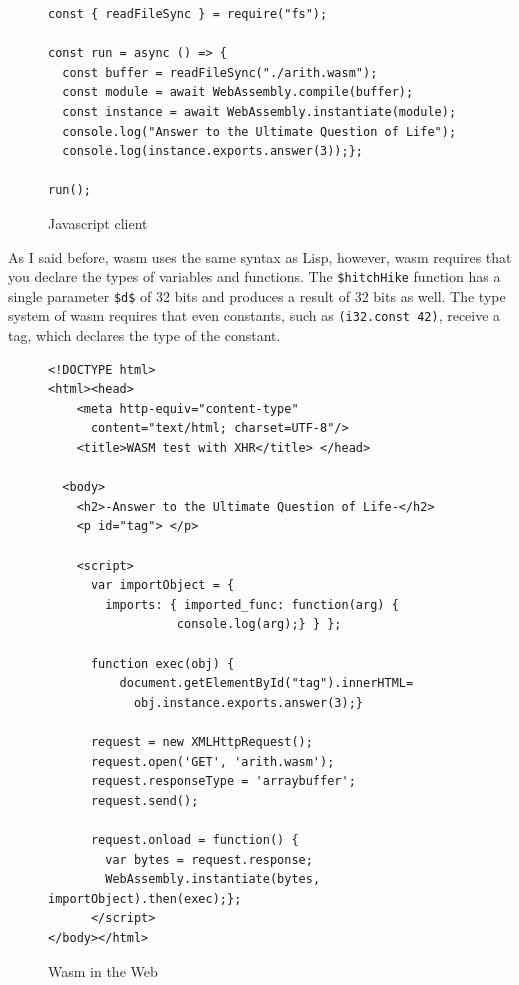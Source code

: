 \documentclass[a4paper,12pt]{book}
\begin{document}
\begin{figure}[!h]
\begin{verbatim}
const { readFileSync } = require("fs");

const run = async () => {
  const buffer = readFileSync("./arith.wasm");
  const module = await WebAssembly.compile(buffer);
  const instance = await WebAssembly.instantiate(module);
  console.log("Answer to the Ultimate Question of Life");
  console.log(instance.exports.answer(3));};

run();
\end{verbatim}

\caption{Javascript client}
\label{wasm:client}
\end{figure}

As I said before, wasm uses the same syntax
as Lisp, however, wasm requires that you declare
the types of variables and functions. The
\verb|$hitchHike| function has a single
parameter \verb|$d$| of 32 bits and produces
a result of 32 bits as well. The type system
of wasm requires that even constants, such
as \verb|(i32.const 42)|, receive a tag, which
declares the type of the constant.


\begin{figure}[!h]
\begin{verbatim}
<!DOCTYPE html>
<html><head>
    <meta http-equiv="content-type"
      content="text/html; charset=UTF-8"/>
    <title>WASM test with XHR</title> </head>

  <body>
    <h2>-Answer to the Ultimate Question of Life-</h2>
    <p id="tag"> </p>

    <script>
      var importObject = {
        imports: { imported_func: function(arg) {
  	              console.log(arg);} } };

      function exec(obj) {
          document.getElementById("tag").innerHTML=
            obj.instance.exports.answer(3);}

      request = new XMLHttpRequest();
      request.open('GET', 'arith.wasm');
      request.responseType = 'arraybuffer';
      request.send();
      
      request.onload = function() {
        var bytes = request.response;
        WebAssembly.instantiate(bytes, importObject).then(exec);};
      </script>
</body></html>
\end{verbatim}

\caption{Wasm in the Web}
\label{wasm:web}
\end{figure}
\end{document}
